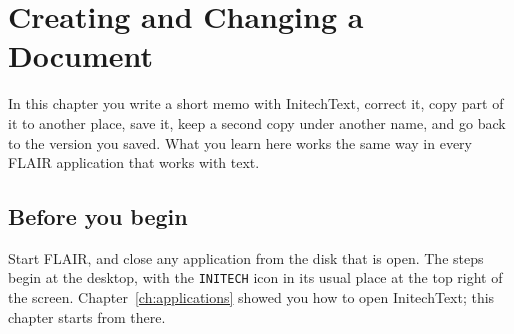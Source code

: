 \chapter{Creating and Changing a Document}
\label{ch:documents}

In this chapter you write a short memo with InitechText, correct it,
copy part of it to another place, save it, keep a second copy under
another name, and go back to the version you saved.  What you learn here
works the same way in every FLAIR application that works with text.

\section{Before you begin}
Start FLAIR, and close any application from the disk that is open.  The
steps begin at the desktop, with the \texttt{INITECH} icon in its usual
place at the top right of the screen.  Chapter~\ref{ch:applications}
showed you how to open InitechText; this chapter starts from there.

